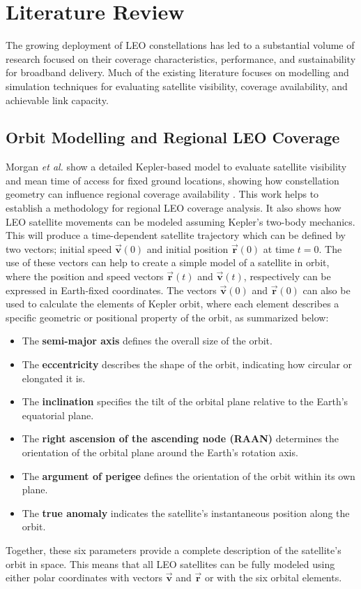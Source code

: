 \chapter{Literature Review}\label{chapter:2}

The growing deployment of LEO constellations has led to a substantial volume of research focused on their coverage characteristics, performance, and sustainability for broadband delivery. Much of the existing literature focuses on modelling and simulation techniques for evaluating satellite visibility, coverage availability, and achievable link capacity. 


\section{Orbit Modelling and Regional LEO Coverage}
Morgan \textit{et al.}\cite{MorganJones2019LEO} show a detailed Kepler-based model to evaluate satellite visibility and mean time of access for fixed ground locations, showing how constellation geometry can influence regional coverage availability \cite{MorganJones2019LEO}. This work helps to establish a methodology for regional LEO coverage analysis. It also shows how LEO satellite movements can be modeled assuming Kepler's two-body mechanics. This will produce a time-dependent satellite trajectory which can be defined by two vectors; initial speed $\vec{\boldsymbol{v}}(0)$ and initial position $\vec{\boldsymbol{r}}(0)$ at time $t = 0$. The use of these vectors can help to create a simple model of a satellite in orbit, where the position and speed vectors $\vec{\boldsymbol{r}}(t)$ and $\vec{\boldsymbol{v}}(t)$, respectively can be expressed in Earth-fixed coordinates. The vectors $\vec{\boldsymbol{v}}(0)$ and $\vec{\boldsymbol{r}}(0)$ can also be used to calculate the elements of Kepler orbit, where each element describes a specific geometric or positional property of the orbit, as summarized below:
\begin{itemize}
  \item The \textbf{semi-major axis} defines the overall size of the orbit.
  \item The \textbf{eccentricity} describes the shape of the orbit, indicating how circular or elongated it is.
  \item The \textbf{inclination} specifies the tilt of the orbital plane relative to the Earth's equatorial plane.
  \item The \textbf{right ascension of the ascending node (RAAN)} determines the orientation of the orbital plane around the Earth's rotation axis.
  \item The \textbf{argument of perigee} defines the orientation of the orbit within its own plane.
  \item The \textbf{true anomaly} indicates the satellite's instantaneous position along the orbit.
\end{itemize}
Together, these six parameters provide a complete description of the satellite's orbit in space. This means that all LEO satellites can be fully modeled using either polar coordinates with vectors $\vec{\boldsymbol{v}}$ and $\vec{\boldsymbol{r}}$ or with the six orbital elements.

